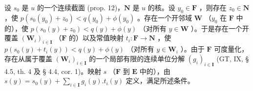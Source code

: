 设 \(s_0\) 是 \(u\) 的一个连续截面 (prop. 12)，\(\mathbf{N}\) 是 \(u\) 的核。设 \(y_0 \in \mathbf{F}\) ，则存在 \(z_0 \in \mathbf{N}\) ，使 \(p(s_0(y_0) + z_0) < q(y_0) + \phi(y_0)\) 。存在一个开邻域 \(\mathbf{W}\) （\(y_0\) 在 \(\mathbf{F}\) 中的），使 \(p(s_0(y) + z_0) < q(y) + \phi(y)\) （对所有 \(y \in \mathbf{W}\) ）。于是存在一个开覆盖 \((\mathbf{W}_i)_{i \in \mathbf{I}}\) （\(\mathbf{F}\) 的）以及常值映射 \(t_i: \mathbf{F} \to \mathbf{N}\) ，使 \(p(s_0(y) + t_i(y)) < q(y) + \phi(y)\) （对所有 \(y \in \mathbf{W}_i\) ）。由于 \(\mathbf{F}\) 可度量化，存在从属于覆盖 \((\mathbf{W}_i)_{i \in \mathbf{I}}\) 的一个局部有限的连续单位分解 \((g_i)_{i \in \mathbf{I}}\) (GT, IX, § 4.5, th. 4 及 § 4.4, cor. 1)。映射 \(s\) （\(\mathbf{F}\) 到 \(\mathbf{E}\) 中的），由 \(s(y) = s_0(y) + \sum_{i \in \mathbf{I}} g_i(y). t_i(y)\) 定义，满足所述条件。


